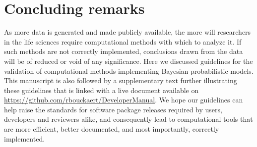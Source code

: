 \documentclass[oneside]{article}
\begin{document}



\section*{Concluding remarks}

As more data is generated and made publicly available, the more will
researchers in the life sciences require computational methods with
which to analyze it.
If such methods are not correctly implemented, conclusions drawn from
the data will be of reduced or void of any significance.
Here we discussed guidelines for the validation of computational methods
implementing Bayesian probabilistic models.
This manuscript is also followed by a supplementary text further
illustrating these guidelines that is linked with a live document
available on \href{https://github.com/rbouckaert/DeveloperManual}{https://github.com/rbouckaert/DeveloperManual}.
We hope our guidelines can help raise the standards for software
package releases required by users, developers and reviewers alike,
and consequently lead to computational tools that are more efficient,
better documented, and most importantly, correctly implemented.
\end{document}
